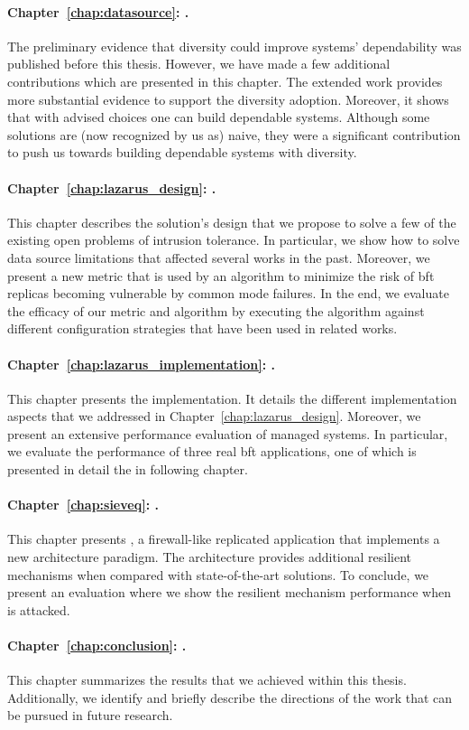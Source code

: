 \paragraph{Chapter~\ref{chap:datasource}: .}
The preliminary evidence that diversity could improve systems' dependability was published before this thesis. 
However, we have made a few additional contributions which are presented in this chapter. 
The extended work provides more substantial evidence to support the diversity adoption.
Moreover, it shows that with advised choices one can build dependable systems.
Although some solutions are (now recognized by us as) naive, they were a significant contribution to push us towards building dependable systems with diversity.


\paragraph{Chapter~\ref{chap:lazarus_design}: .}
This chapter describes the solution's design that we propose to solve a few of the existing open problems of intrusion tolerance.
In particular, we show how to solve data source limitations that affected several works in the past.
Moreover, we present a new metric that is used by an algorithm to minimize the risk of \gls{bft} replicas becoming vulnerable by common mode failures.
In the end, we evaluate the efficacy of our metric and algorithm by executing the algorithm against different configuration strategies that have been used in related works.


\paragraph{Chapter~\ref{chap:lazarus_implementation}: .}
This chapter presents the \system implementation. 
It details the different implementation aspects that we addressed in Chapter~\ref{chap:lazarus_design}. 
Moreover, we present an extensive performance evaluation of \system managed systems.
In particular, we evaluate the performance of three real \gls{bft} applications, one of which is presented in detail the in following chapter.

\paragraph{Chapter~\ref{chap:sieveq}: .}
This chapter presents \sieveq, a firewall-like replicated application that implements a new architecture paradigm.
The \sieveq architecture provides additional resilient mechanisms when compared with state-of-the-art solutions.
To conclude, we present an evaluation where we show the resilient mechanism performance when \sieveq is attacked.



\paragraph{Chapter~\ref{chap:conclusion}: .}
This chapter summarizes the results that we achieved within this thesis.
Additionally, we identify and briefly describe the directions of the work that can be pursued in future research.   

